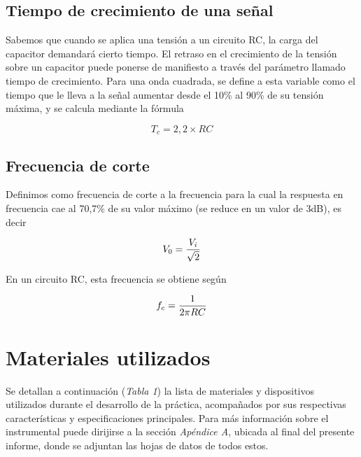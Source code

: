 \documentclass{article}
\begin{document}
\subsection{Tiempo de crecimiento de una señal}

	Sabemos que cuando se aplica una tensión a un circuito RC, la carga del capacitor demandará cierto tiempo. El retraso en el crecimiento de la tensión sobre un capacitor puede ponerse de manifiesto a través del parámetro llamado tiempo de crecimiento. Para una onda cuadrada, se define a esta variable como el tiempo que le lleva a la señal aumentar desde el 10\% al 90\% de su tensión máxima, y se calcula mediante la fórmula

\begin{equation*}
	T_c = 2,2 \times RC
\end{equation*}
\smallskip


\subsection{Frecuencia de corte}

Definimos como frecuencia de corte a la frecuencia para la cual la respuesta en frecuencia cae al 70,7\% de su valor máximo (se reduce en un valor de 3dB), es decir

\begin{equation*}
	V_0 = {V_i \over \sqrt{2}}
\end{equation*}
\medskip

\noindent En un circuito RC, esta frecuencia se obtiene según
\medskip

\begin{equation*}
	f_c = {1 \over 2 \pi RC}
\end{equation*}
\medskip

\bigskip\bigskip




\section{Materiales utilizados}

	Se detallan a continuación (\textit{Tabla 1}) la lista de materiales y dispositivos utilizados durante el desarrollo de la práctica, acompañados por sus respectivas características y especificaciones principales. Para más información sobre el instrumental puede dirijirse a la sección \textit{Apéndice A}, ubicada al final del presente informe, donde se adjuntan las hojas de datos de todos estos.
\bigskip\bigskip
\end{document}
